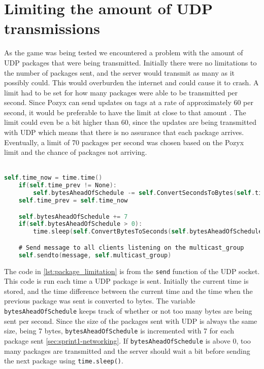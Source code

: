 \section{Limiting the amount of UDP transmissions}
As the game was being tested we encountered a problem with the amount of UDP packages that were being transmitted.
Initially there were no limitations to the number of packages sent, and the server would transmit as many as it possibly could.
This would overburden the internet and could cause it to crash.
A limit had to be set for how many packages were able to be transmitted per second.
Since Pozyx can send updates on tags at a rate of approximately 60 per second, it would be preferable to have the limit at close to that amount \cite{pozyx-Performance}.
The limit could even be a bit higher than 60, since the updates are being transmitted with UDP which means that there is no assurance that each package arrives.
Eventually, a limit of 70 packages per second was chosen based on the Pozyx limit and the chance of packages not arriving.
\\\\
\begin{lstlisting}[caption={Implementaion of the limit on the amount of packages that can be sent per second}, captionpos=b,language=C,label={lst:package_limitation}]
    self.time_now = time.time()
    if(self.time_prev != None):
        self.bytesAheadOfSchedule -= self.ConvertSecondsToBytes(self.time_now - self.time_prev)
    self.time_prev = self.time_now

    self.bytesAheadOfSchedule += 7
    if(self.bytesAheadOfSchedule > 0):
        time.sleep(self.ConvertBytesToSeconds(self.bytesAheadOfSchedule))

    # Send message to all clients listening on the multicast_group
    self.sendto(message, self.multicast_group)
\end{lstlisting}
The code in \autoref{lst:package_limitation} is from the \texttt{send} function of the UDP socket.
This code is run each time a UDP package is sent.
Initially the current time is stored, and the time difference between the current time and the time when the previous package was sent is converted to bytes.
The variable \texttt{bytesAheadOfSchedule} keeps track of whether or not too many bytes are being sent per second.
Since the size of the packages sent with UDP is always the same size, being 7 bytes, \texttt{bytesAheadOfSchedule} is incremented with 7 for each package sent \autoref{sec:sprint1-networking}.
If \texttt{bytesAheadOfSchedule} is above 0, too many packages are transmitted and the server should wait a bit before sending the next package using \texttt{time.sleep()}.
